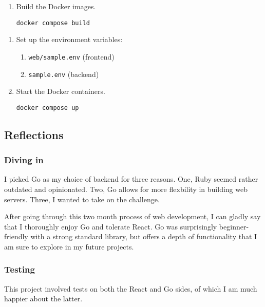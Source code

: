 \documentclass[12pt]{exam}
\begin{document}
\begin{enumerate}
\def\labelenumi{\arabic{enumi}.}
\setcounter{enumi}{1}
\item
  Build the Docker images.

\texttt{docker\ compose\ build}
\end{enumerate}


\begin{enumerate}
\def\labelenumi{\arabic{enumi}.}
\setcounter{enumi}{2}
\item
  Set up the environment variables:

  \begin{enumerate}
  \def\labelenumii{\arabic{enumii}.}
  \item
    \texttt{web/sample.env} (frontend)
  \item
    \texttt{sample.env} (backend)
  \end{enumerate}
\item
  Start the Docker containers.

\texttt{docker\ compose\ up}
\end{enumerate}


\hypertarget{reflections}{%
\subsection{Reflections}\label{reflections}}

\hypertarget{diving-in}{%
\subsubsection{Diving in}\label{diving-in}}

I picked Go as my choice of backend for three reasons. One, Ruby seemed
rather outdated and opinionated. Two, Go allows for more flexbility in
building web servers. Three, I wanted to take on the challenge.

After going through this two month process of web development, I can
gladly say that I thoroughly enjoy Go and tolerate React. Go was
surprisingly beginner-friendly with a strong standard library, but
offers a depth of functionality that I am sure to explore in my future
projects.

\hypertarget{testing}{%
\subsubsection{Testing}\label{testing}}

This project involved tests on both the React and Go sides, of which I
am much happier about the latter.
\end{document}
